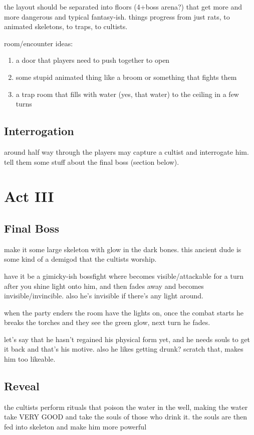 \documentclass[a5paper,11pt]{book}
\begin{document}
\begin{multicols}{2}
the layout should be separated into floors (4+boss arena?) that get more and more dangerous and typical fantasy-ish. things progress from just rats, to animated skeletons, to traps, to cultists.

room/encounter ideas:
\begin{enumerate}
  \item a door that players need to push together to open
  \item some stupid animated thing like a broom or something that fights them
  \item a trap room that fills with water (yes, that water) to the ceiling in a few turns
\end{enumerate}

\subsection{Interrogation}
around half way through the players may capture a cultist and interrogate him. tell them some stuff about the final boss (section below).

\section{Act III}
\subsection{Final Boss}
make it some large skeleton with glow in the dark bones. this ancient dude is some kind of a demigod that the cultists worship.

have it be a gimicky-ish bossfight where becomes visible/attackable for a turn after you shine light onto him, and then fades away and becomes invisible/invincible. also he's invisible if there's any light around.

when the party enders the room have the lights on, once the combat starts he breaks the torches and they see the green glow, next turn he fades.

let's say that he hasn't regained his physical form yet, and he needs souls to get it back and that's his motive. also he likes getting drunk? scratch that, makes him too likeable.

\subsection{Reveal}
the cultists perform rituals that poison the water in the well, making the water take VERY GOOD and take the souls of those who drink it. the souls are then fed into skeleton and make him more powerful

\end{multicols}
\end{document}
